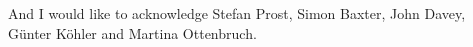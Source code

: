 
\begin{acknowledgements}      


And I would like to acknowledge Stefan Prost, Simon Baxter, John Davey, G\"{u}nter K\"{o}hler and Martina Ottenbruch.


\end{acknowledgements}
